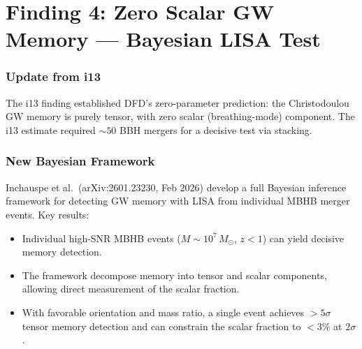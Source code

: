 \documentclass[11pt]{article}
\begin{document}
\part{Finding 4: Zero Scalar GW Memory --- Bayesian LISA Test}
\label{part:memory-bayes}

\section{Update from i13}

The i13 finding established DFD's zero-parameter prediction: the
Christodoulou GW memory is purely tensor, with zero scalar
(breathing-mode) component. The i13 estimate required $\sim 50$
BBH mergers for a decisive test via stacking.

\section{New Bayesian Framework}

Inchauspe et al.\ (arXiv:2601.23230, Feb 2026) develop a full
Bayesian inference framework for detecting GW memory with LISA from
individual MBHB merger events. Key results:
\begin{itemize}[nosep]
\item Individual high-SNR MBHB events ($M \sim 10^7\,M_\odot$,
  $z < 1$) can yield decisive memory detection.
\item The framework decompose memory into tensor and scalar
  components, allowing direct measurement of the scalar fraction.
\item With favorable orientation and mass ratio, a single event
  achieves $> 5\sigma$ tensor memory detection and can constrain
  the scalar fraction to $< 3\%$ at $2\sigma$.
\end{itemize}
\end{document}
